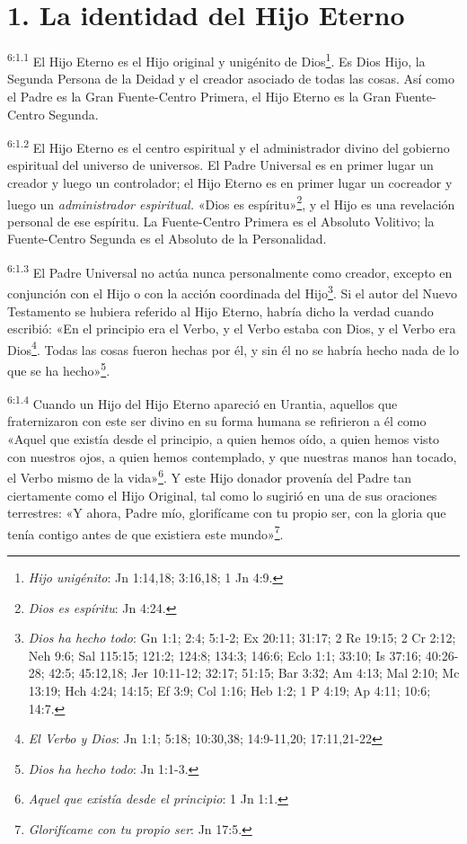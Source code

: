 \section*{1. La identidad del Hijo Eterno}
\par
\textsuperscript{6:1.1} El Hijo Eterno es el Hijo original y unigénito de Dios\footnote{\textit{Hijo unigénito}: Jn 1:14,18; 3:16,18; 1 Jn 4:9.}. Es Dios Hijo, la Segunda Persona de la Deidad y el creador asociado de todas las cosas. Así como el Padre es la Gran Fuente-Centro Primera, el Hijo Eterno es la Gran Fuente-Centro Segunda.

\par
\textsuperscript{6:1.2} El Hijo Eterno es el centro espiritual y el administrador divino del gobierno espiritual del universo de universos. El Padre Universal es en primer lugar un creador y luego un controlador; el Hijo Eterno es en primer lugar un cocreador y luego un \textit{administrador espiritual.} «Dios es espíritu»\footnote{\textit{Dios es espíritu}: Jn 4:24.}, y el Hijo es una revelación personal de ese espíritu. La Fuente-Centro Primera es el Absoluto Volitivo; la Fuente-Centro Segunda es el Absoluto de la Personalidad.

\par
\textsuperscript{6:1.3} El Padre Universal no actúa nunca personalmente como creador, excepto en conjunción con el Hijo o con la acción coordinada del Hijo\footnote{\textit{Dios ha hecho todo}: Gn 1:1; 2:4; 5:1-2; Ex 20:11; 31:17; 2 Re 19:15; 2 Cr 2:12; Neh 9:6; Sal 115:15; 121:2; 124:8; 134:3; 146:6; Eclo 1:1; 33:10; Is 37:16; 40:26-28; 42:5; 45:12,18; Jer 10:11-12; 32:17; 51:15; Bar 3:32; Am 4:13; Mal 2:10; Mc 13:19; Hch 4:24; 14:15; Ef 3:9; Col 1:16; Heb 1:2; 1 P 4:19; Ap 4:11; 10:6; 14:7.}. Si el autor del Nuevo Testamento se hubiera referido al Hijo Eterno, habría dicho la verdad cuando escribió: «En el principio era el Verbo, y el Verbo estaba con Dios, y el Verbo era Dios\footnote{\textit{El Verbo y Dios}: Jn 1:1; 5:18; 10:30,38; 14:9-11,20; 17:11,21-22}. Todas las cosas fueron hechas por él, y sin él no se habría hecho nada de lo que se ha hecho»\footnote{\textit{Dios ha hecho todo}: Jn 1:1-3.}.

\par
\textsuperscript{6:1.4} Cuando un Hijo del Hijo Eterno apareció en Urantia, aquellos que fraternizaron con este ser divino en su forma humana se refirieron a él como «Aquel que existía desde el principio, a quien hemos oído, a quien hemos visto con nuestros ojos, a quien hemos contemplado, y que nuestras manos han tocado, el Verbo mismo de la vida»\footnote{\textit{Aquel que existía desde el principio}: 1 Jn 1:1.}. Y este Hijo donador provenía del Padre tan ciertamente como el Hijo Original, tal como lo sugirió en una de sus oraciones terrestres: «Y ahora, Padre mío, glorifícame con tu propio ser, con la gloria que tenía contigo antes de que existiera este mundo»\footnote{\textit{Glorifícame con tu propio ser}: Jn 17:5.}.

